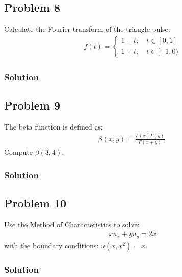 \subsection*{Problem 8}
Calculate the Fourier transform of the triangle pulse:
\begin{align*}
    f(t) = \begin{cases}
        1-t; \quad t \in [0, 1]\\
        1 + t; \quad t \in [-1, 0)
    \end{cases}
\end{align*}

\subsubsection*{Solution}

\subsection*{Problem 9}
The beta function is defined as:
\begin{align*}
    \beta(x,y) = \frac{\Gamma(x)\Gamma(y)}{\Gamma(x +y)}.
\end{align*}Compute $\beta(3,4)$.

\subsubsection*{Solution}

\subsection*{Problem 10}
Use the Method of Characteristics to solve:
\begin{align*}
    xu_x + yu_y = 2x
\end{align*}with the boundary conditions: $u(x,x^2) = x$.

\subsubsection*{Solution}